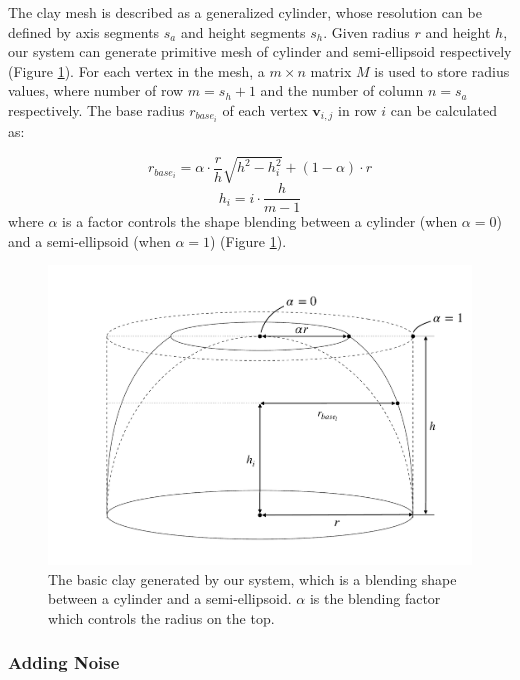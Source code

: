 \documentclass{svjour3}                     %
\begin{document}
The clay mesh is described as a generalized cylinder, whose resolution can be defined by axis segments $s_{a}$ and height segments $s_{h}$. Given radius $r$ and height $h$, our system can generate primitive mesh of cylinder and semi-ellipsoid respectively (Figure \ref{fig:base}).
For each vertex in the mesh, a $m \times n$ matrix $M$ is used to store radius values, where number of row $m = s_{h} + 1$ and the number of column $n = s_{a}$ respectively. The base radius $r_{base_{i}}$ of each vertex $\mathbf{v}_{i,j}$ in row $i$ can be calculated as: 

\begin{equation}
r_{base_{i}} = \alpha \cdot \frac{r}{h} \sqrt{h^2 -  h_{i}^2} + (1 - \alpha) \cdot r
\end{equation}
\begin{equation}
h_{i} = i \cdot \frac{h}{m-1}
\end{equation}
where $\alpha$ is a factor controls the shape blending between a  cylinder (when $\alpha=0$) and a semi-ellipsoid (when $\alpha=1$) (Figure \ref{fig:base}).

\begin{figure}
\includegraphics[width=\textwidth]{fig4.pdf}
\caption{The basic clay generated by our system, which is a blending shape between a cylinder and a semi-ellipsoid. $\alpha$ is the blending factor which controls the radius on the top.}
\label{fig:base}
\end{figure}

\subsubsection{Adding Noise}
\end{document}
